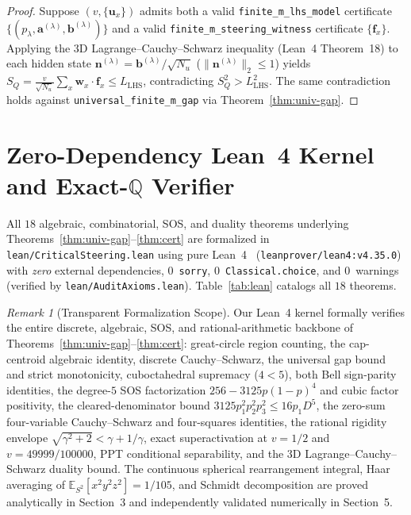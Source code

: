 \documentclass[11pt,a4paper]{article}
\theoremstyle{definition}
\theoremstyle{remark}
\newtheorem{remark}[theorem]{Remark}
\newcommand{\QQ}{\mathbb{Q}}
\begin{document}
\begin{proof}
Suppose $(v, \{\mathbf{u}_x\})$ admits both a valid \texttt{finite\_m\_lhs\_model} certificate $\{(p_\lambda, \mathbf{a}^{(\lambda)}, \mathbf{b}^{(\lambda)})\}$ and a valid \texttt{finite\_m\_steering\_witness} certificate $\{\mathbf{f}_x\}$. Applying the $3$D Lagrange--Cauchy--Schwarz inequality (Lean~4 Theorem~18) to each hidden state $\mathbf{n}^{(\lambda)} = \mathbf{b}^{(\lambda)}/\sqrt{N_u}$ ($\|\mathbf{n}^{(\lambda)}\|_2 \le 1$) yields $S_Q = \frac{v}{\sqrt{N_u}}\sum_x \mathbf{w}_x\cdot\mathbf{f}_x \le L_{\mathrm{LHS}}$, contradicting $S_Q^2 > L_{\mathrm{LHS}}^2$. The same contradiction holds against \texttt{universal\_finite\_m\_gap} via Theorem~\ref{thm:univ-gap}.
\end{proof}

\section{Zero-Dependency Lean~4 Kernel and Exact-\texorpdfstring{$\QQ$}{Q} Verifier}

All $18$ algebraic, combinatorial, SOS, and duality theorems underlying Theorems~\ref{thm:univ-gap}--\ref{thm:cert} are formalized in \texttt{lean/CriticalSteering.lean} using pure Lean~4~\cite{demoura2021lean4} (\texttt{leanprover/lean4:v4.35.0}) with \emph{zero} external dependencies, $0$~\texttt{sorry}, $0$~\texttt{Classical.choice}, and $0$~warnings (verified by \texttt{lean/AuditAxioms.lean}). Table~\ref{tab:lean} catalogs all $18$ theorems.

\begin{remark}[Transparent Formalization Scope]
Our Lean~4 kernel formally verifies the entire discrete, algebraic, SOS, and rational-arithmetic backbone of Theorems~\ref{thm:univ-gap}--\ref{thm:cert}: great-circle region counting, the cap-centroid algebraic identity, discrete Cauchy--Schwarz, the universal gap bound and strict monotonicity, cuboctahedral supremacy ($4 < 5$), both Bell sign-parity identities, the degree-$5$ SOS factorization $256 - 3125 p(1-p)^4$ and cubic factor positivity, the cleared-denominator bound $3125 p_1^2 p_2^2 p_3^2 \le 16 p_1 D^5$, the zero-sum four-variable Cauchy--Schwarz and four-squares identities, the rational rigidity envelope $\sqrt{\gamma^2+2} < \gamma + 1/\gamma$, exact superactivation at $v=1/2$ and $v=49999/100000$, PPT conditional separability, and the $3$D Lagrange--Cauchy--Schwarz duality bound. The continuous spherical rearrangement integral, Haar averaging of $\mathbb{E}_{S^2}[x^2 y^2 z^2] = 1/105$, and Schmidt decomposition are proved analytically in Section~3 and independently validated numerically in Section~5.
\end{remark}
\end{document}

